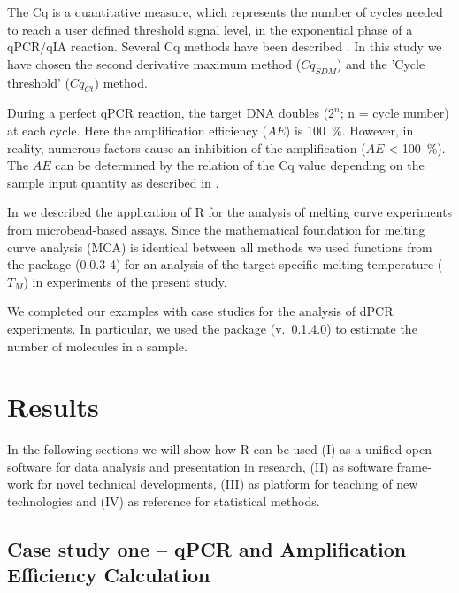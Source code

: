 The Cq is a quantitative measure, which represents the number of cycles 
needed to reach a user defined threshold signal level, in the exponential phase 
of a qPCR/qIA reaction. Several Cq methods have been described 
\citep{ruijter_2013}. In this study we have chosen the second derivative maximum 
method ($Cq_{SDM}$) and the 'Cycle threshold' ($Cq_{Ct}$) method.

During a perfect qPCR reaction, the target DNA doubles ($2^{n}$; n = cycle 
number) at each cycle. Here the amplification efficiency ($AE$) is 100~\%. 
However, in reality, numerous factors cause an inhibition of the amplification 
($AE$ < 100~\%). The $AE$ can be determined by the relation of the Cq value 
depending on the sample input quantity as described in 
\citep{roediger_2015_Bioinformatics, svec_2015}.

In \citet{roediger_RJ_2013} we described the application of R for the analysis 
of melting curve experiments from microbead-based assays. Since the mathematical 
foundation for melting curve analysis (MCA) is identical between all methods
we used functions from the  package (0.0.3-4) for an 
analysis of the target specific melting temperature ($T_{M}$) in experiments of 
the present study.

We completed our examples with case studies for the analysis of dPCR 
experiments. In particular, we used the  package (v.~0.1.4.0) to 
estimate the number of molecules in a sample.

\section{Results}

In the following sections we will show how R can be used (I) as a unified open 
software for data analysis and presentation in research, (II) as software 
frame-work for novel technical developments, (III) as platform for teaching of 
new technologies and (IV) as reference for statistical methods.

\subsection{Case study one -- qPCR and Amplification Efficiency Calculation}

